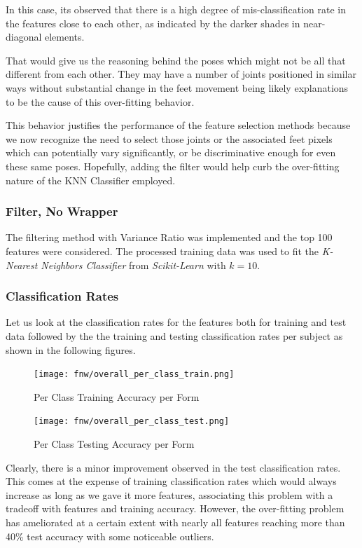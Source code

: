 \documentclass[12pt,twoside,a4paper]{article}
\begin{document}
In this case, its observed that there is a high degree of mis-classification rate in the features close to each other, as indicated by the darker shades in near-diagonal
elements.

That would give us the reasoning behind the poses which might not be all that different from each other. They may have a number of joints positioned in similar ways without substantial change in the feet movement being likely explanations to be the cause of this over-fitting behavior.

This behavior justifies the performance of the feature selection methods because we now recognize the need to select those joints or the associated feet pixels which can potentially vary significantly, or be discriminative enough for even these same poses. Hopefully, adding the filter would help curb the over-fitting nature of the KNN Classifier employed.

\subsubsection{Filter, No Wrapper}

The filtering method with Variance Ratio was implemented and the top 100 features were considered. The processed training data was used to fit the \textit{K-Nearest Neighbors Classifier} from \textit{Scikit-Learn} with $k=10$.

\subsubsection*{Classification Rates}
Let us look at the classification rates for the features both for training and test data followed by the the training and testing classification rates per subject as shown in the following figures.

\begin{figure}[H]
    \centering
    \texttt{[image: fnw/overall\_per\_class\_train.png]}
    \caption{Per Class Training Accuracy per Form}
    \label{fig: F1}
\end{figure}

\begin{figure}[H]
    \centering
    \texttt{[image: fnw/overall\_per\_class\_test.png]}
    \caption{Per Class Testing Accuracy per Form}
    \label{fig: F2}
\end{figure}

Clearly, there is a minor improvement observed in the test classification rates. This comes at the expense of training classification rates which would always increase as long as we gave it more features, associating this problem with a tradeoff with features and training accuracy. However, the over-fitting problem has ameliorated at a certain extent with nearly all features reaching more than 40\% test accuracy with some noticeable outliers.
\end{document}
